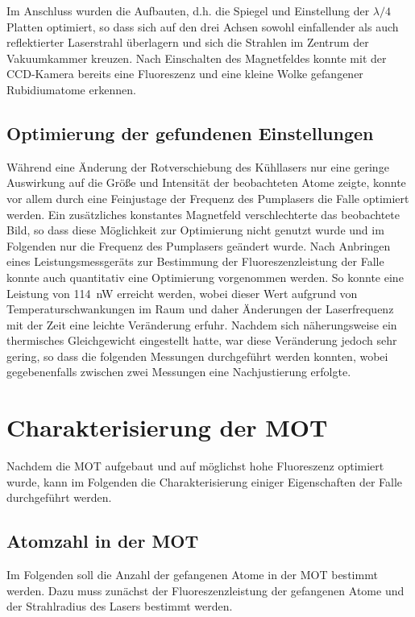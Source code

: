 \documentclass[11pt, a4paper]{article}
\numberwithin{equation}{section}
\begin{document}
Im Anschluss wurden die Aufbauten, d.h. die Spiegel und Einstellung der $\lambda/4$ Platten optimiert, so dass sich auf den drei Achsen sowohl einfallender als auch reflektierter Laserstrahl überlagern und sich die Strahlen im Zentrum der Vakuumkammer kreuzen.
Nach Einschalten des Magnetfeldes konnte mit der CCD-Kamera bereits eine Fluoreszenz und eine kleine Wolke gefangener Rubidiumatome erkennen.

\subsection{Optimierung der gefundenen Einstellungen}

Während eine Änderung der Rotverschiebung des Kühllasers nur eine geringe Auswirkung auf die Größe und Intensität der beobachteten Atome zeigte, konnte vor allem durch eine Feinjustage der Frequenz des Pumplasers die Falle optimiert werden.
Ein zusätzliches konstantes Magnetfeld verschlechterte das beobachtete Bild, so dass diese Möglichkeit zur Optimierung nicht genutzt wurde und im Folgenden nur die Frequenz des Pumplasers geändert wurde.
Nach Anbringen eines Leistungsmessgeräts zur Bestimmung der Fluoreszenzleistung der Falle konnte auch quantitativ eine Optimierung vorgenommen werden.
So konnte eine Leistung von \SI{114}{nW} erreicht werden, wobei dieser Wert aufgrund von Temperaturschwankungen im Raum und daher Änderungen der Laserfrequenz mit der Zeit eine leichte Veränderung erfuhr.
Nachdem sich näherungsweise ein thermisches Gleichgewicht eingestellt hatte, war diese Veränderung jedoch sehr gering, so dass die folgenden Messungen durchgeführt werden konnten, wobei gegebenenfalls zwischen zwei Messungen eine Nachjustierung erfolgte.

\section{Charakterisierung der MOT}
\label{sec:charakterisierung_mot}
Nachdem die MOT aufgebaut und auf möglichst hohe Fluoreszenz optimiert wurde, kann im Folgenden die Charakterisierung einiger Eigenschaften der Falle durchgeführt werden.

\subsection{Atomzahl in der MOT}
Im Folgenden soll die Anzahl der gefangenen Atome in der MOT bestimmt werden.
Dazu muss zunächst der Fluoreszenzleistung der gefangenen Atome und der Strahlradius des Lasers bestimmt werden.
\end{document}
